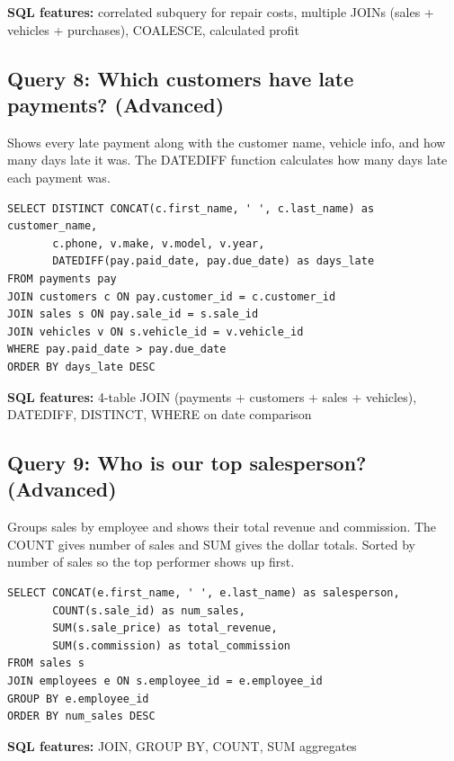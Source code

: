\documentclass[12pt]{article}
\begin{document}
\textbf{SQL features:} correlated subquery for repair costs, multiple JOINs (sales + vehicles + purchases), COALESCE, calculated profit

\subsection{Query 8: Which customers have late payments? (Advanced)}

Shows every late payment along with the customer name, vehicle info, and how many days late it was. The DATEDIFF function calculates how many days late each payment was. 

\begin{lstlisting}[style=sql]
SELECT DISTINCT CONCAT(c.first_name, ' ', c.last_name) as customer_name,
       c.phone, v.make, v.model, v.year,
       DATEDIFF(pay.paid_date, pay.due_date) as days_late
FROM payments pay
JOIN customers c ON pay.customer_id = c.customer_id
JOIN sales s ON pay.sale_id = s.sale_id
JOIN vehicles v ON s.vehicle_id = v.vehicle_id
WHERE pay.paid_date > pay.due_date
ORDER BY days_late DESC
\end{lstlisting}

\textbf{SQL features:} 4-table JOIN (payments + customers + sales + vehicles), DATEDIFF, DISTINCT, WHERE on date comparison

\subsection{Query 9: Who is our top salesperson? (Advanced)}

Groups sales by employee and shows their total revenue and commission. The COUNT gives number of sales and SUM gives the dollar totals. Sorted by number of sales so the top performer shows up first.

\begin{lstlisting}[style=sql]
SELECT CONCAT(e.first_name, ' ', e.last_name) as salesperson,
       COUNT(s.sale_id) as num_sales,
       SUM(s.sale_price) as total_revenue,
       SUM(s.commission) as total_commission
FROM sales s
JOIN employees e ON s.employee_id = e.employee_id
GROUP BY e.employee_id
ORDER BY num_sales DESC
\end{lstlisting}

\textbf{SQL features:} JOIN, GROUP BY, COUNT, SUM aggregates

\end{document}
